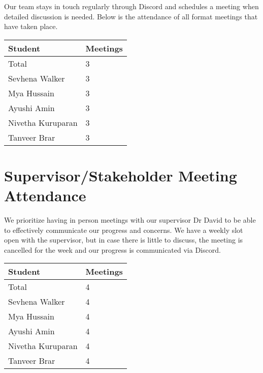 \documentclass{article}
\begin{document}
Our team stays in touch regularly through Discord and schedules a
meeting when detailed discussion is needed. Below is the attendance
of all format meetings that have taken place.


\begin{table}[H]
  \centering
  \begin{tabular}{ll}
    \toprule
    \textbf{Student} & \textbf{Meetings}\\
    \midrule
    Total & 3\\
    Sevhena Walker & 3\\
    Mya Hussain & 3\\
    Ayushi Amin & 3\\
    Nivetha Kuruparan & 3\\
    Tanveer Brar & 3\\
    \bottomrule
  \end{tabular}
\end{table}


\section{Supervisor/Stakeholder Meeting Attendance}


We prioritize having in person meetings with our supervisor Dr David
to be able to effectively communicate our progress and concerns. We
have a weekly slot open with the supervisor, but in case there is
little to discuss, the meeting is cancelled for the week and our
progress is communicated via Discord.

\begin{table}[H]
  \centering
  \begin{tabular}{ll}
    \toprule
    \textbf{Student} & \textbf{Meetings}\\
    \midrule
    Total & 4\\
    Sevhena Walker & 4\\
    Mya Hussain & 4\\
    Ayushi Amin & 4\\
    Nivetha Kuruparan & 4\\
    Tanveer Brar & 4\\
    \bottomrule
  \end{tabular}
\end{table}
\end{document}
